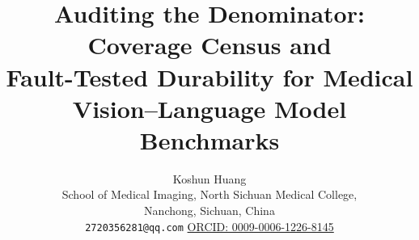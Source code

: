 \documentclass[11pt]{article}
\title{Auditing the Denominator: Coverage Census and\\
Fault-Tested Durability for Medical Vision--Language Model Benchmarks}
\author{Koshun Huang\\[2pt]
\small School of Medical Imaging, North Sichuan Medical College,\\
\small Nanchong, Sichuan, China\\[1pt]
\small \texttt{2720356281@qq.com}\quad
\href{https://orcid.org/0009-0006-1226-8145}{ORCID: 0009-0006-1226-8145}}
\date{}
\begin{document}
\maketitle

\begin{abstract}

\end{abstract}












\FloatBarrier



\appendix

\end{document}
